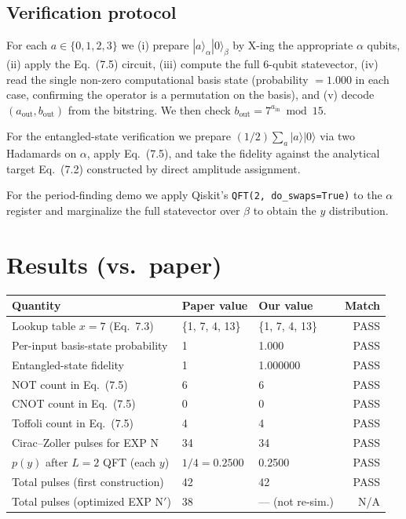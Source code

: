 \documentclass[11pt]{article}
\begin{document}
\subsection{Verification protocol}

For each $a \in \{0,1,2,3\}$ we (i) prepare $|a\rangle_\alpha |0\rangle_\beta$
by X-ing the appropriate $\alpha$ qubits, (ii) apply the Eq.~(7.5) circuit,
(iii) compute the full 6-qubit statevector, (iv) read the single non-zero
computational basis state (probability $= 1.000$ in each case, confirming
the operator is a permutation on the basis), and (v) decode $(a_\mathrm{out},
b_\mathrm{out})$ from the bitstring. We then check
$b_\mathrm{out} = 7^{a_\mathrm{in}} \bmod 15$.

For the entangled-state verification we prepare
$(1/2)\sum_a |a\rangle |0\rangle$ via two Hadamards on $\alpha$, apply
Eq.~(7.5), and take the fidelity against the analytical target Eq.~(7.2)
constructed by direct amplitude assignment.

For the period-finding demo we apply Qiskit's \texttt{QFT(2, do\_swaps=True)}
to the $\alpha$ register and marginalize the full statevector over $\beta$
to obtain the $y$ distribution.

\section{Results (vs.\ paper)}

\begin{center}
\begin{tabular}{@{}lllr@{}}
\toprule
\textbf{Quantity} & \textbf{Paper value} & \textbf{Our value} & \textbf{Match} \\
\midrule
Lookup table $x=7$ (Eq.~7.3)      & \{1, 7, 4, 13\} & \{1, 7, 4, 13\} & PASS \\
Per-input basis-state probability & 1               & 1.000           & PASS \\
Entangled-state fidelity          & 1               & 1.000000        & PASS \\
NOT count in Eq.~(7.5)            & 6               & 6               & PASS \\
CNOT count in Eq.~(7.5)           & 0               & 0               & PASS \\
Toffoli count in Eq.~(7.5)        & 4               & 4               & PASS \\
Cirac--Zoller pulses for EXP N    & 34              & 34              & PASS \\
$p(y)$ after $L=2$ QFT (each $y$) & $1/4 = 0.2500$  & 0.2500          & PASS \\
Total pulses (first construction) & 42              & 42              & PASS \\
Total pulses (optimized EXP N$'$) & 38              & --- (not re-sim.) & N/A \\
\bottomrule
\end{tabular}
\end{center}
\end{document}
